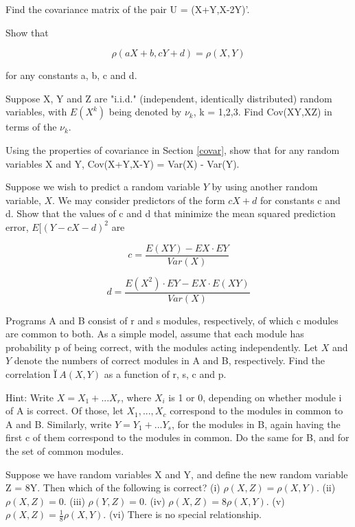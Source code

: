 Find the covariance matrix of the pair U = (X+Y,X-2Y)'.

\oneproblem
Show that

\begin{equation}
\rho(aX+b,cY+d) = \rho(X,Y)
\end{equation}

for any constants a, b, c and d.

\oneproblem
Suppose X, Y and Z are "i.i.d." (independent, identically distributed)
random variables, with $E(X^k)$ being denoted by $\nu_k$, k = 1,2,3.
Find Cov(XY,XZ) in terms of the $\nu_k$.

\oneproblem
Using the properties of covariance in Section \ref{covar}, show that
for any random variables X and Y, Cov(X+Y,X-Y) = Var(X) - Var(Y).

\oneproblem
Suppose we wish to predict a random variable $Y$ by using another random
variable, $X$.  We may consider predictors of the form $cX+d$ for
constants c and d.  Show that the values of c and d that minimize
the mean squared prediction error, $E[(Y- cX - d)^2$ are

\begin{equation}
c = \frac{E(XY) - EX \cdot EY}{Var(X)}
\end{equation}

\begin{equation}
d = \frac{E(X^2) \cdot EY - EX \cdot E(XY)}{Var(X)}
\end{equation}

\oneproblem
Programs A and B consist of r and s modules, respectively, of which c
modules are common to both. As a simple model, assume that each module
has probability p of being correct, with the modules acting
independently. Let $X$ and $Y$ denote the numbers of correct modules in
A and B, respectively.  Find the correlation $Ï~A(X,Y)$ as a function of
r, s, c and p.

Hint:  Write $X = X_1+...X_r$, where $X_i$ is 1 or 0, depending on
whether module i of A is correct.   Of those, let $X_1,...,X_c$
correspond to the modules in common to A and B.  Similarly, write $Y =
Y_1+...Y_s$, for the modules in B, again having the first c of them
correspond to the modules in common.  Do the same for B, and for the set
of common modules.

\oneproblem
Suppose we have random variables X and Y, and define the new
random variable Z = 8Y.  Then which of the following is correct?
(i) $\rho(X,Z) = \rho(X,Y)$.  (ii) $\rho(X,Z) =
0$. (iii) $\rho(Y,Z) = 0$.  (iv) $\rho(X,Z) = 8 \rho(X,Y)$.  (v)
$\rho(X,Z) = \frac{1}{8} \rho(X,Y)$. (vi) There is no special
relationship.

